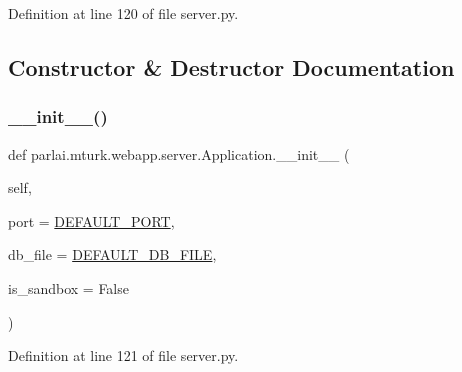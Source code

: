 Definition at line 120 of file server.\+py.



\subsection{Constructor \& Destructor Documentation}
\mbox{\label{classparlai_1_1mturk_1_1webapp_1_1server_1_1Application_a0c8d2d2d9418e9654a734ccef5a09942}} 
\subsubsection{\texorpdfstring{\+\_\+\+\_\+init\+\_\+\+\_\+()}{\_\_init\_\_()}}
{\footnotesize\ttfamily def parlai.\+mturk.\+webapp.\+server.\+Application.\+\_\+\+\_\+init\+\_\+\+\_\+ (\begin{DoxyParamCaption}\item[{}]{self,  }\item[{}]{port = {\ttfamily \hyperlink{namespaceparlai_1_1mturk_1_1webapp_1_1server_ab2dbe49416f69522010b6c9a211af0e3}{D\+E\+F\+A\+U\+L\+T\+\_\+\+P\+O\+RT}},  }\item[{}]{db\+\_\+file = {\ttfamily \hyperlink{namespaceparlai_1_1mturk_1_1webapp_1_1server_a7d1b65251987c39df64aeb32f36f6a9f}{D\+E\+F\+A\+U\+L\+T\+\_\+\+D\+B\+\_\+\+F\+I\+LE}},  }\item[{}]{is\+\_\+sandbox = {\ttfamily False} }\end{DoxyParamCaption})}



Definition at line 121 of file server.\+py.



